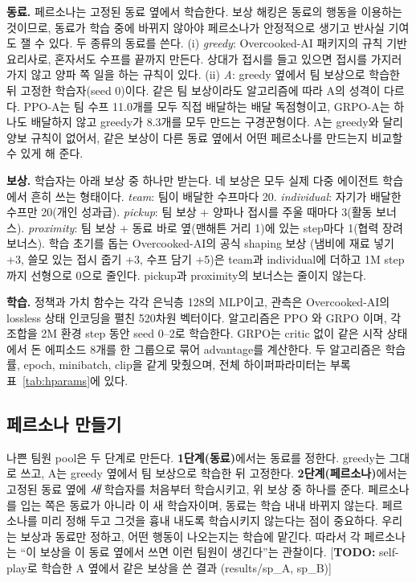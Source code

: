 \documentclass[letterpaper]{article} %
\newcommand{\TODO}[1]{[\textbf{TODO:} #1]}
\begin{document}
\textbf{동료.} 페르소나는 고정된 동료 옆에서 학습한다. 보상 해킹은 동료의 행동을 이용하는 것이므로, 동료가
학습 중에 바뀌지 않아야 페르소나가 안정적으로 생기고 반사실 기여도 잴 수 있다. 두 종류의 동료를 쓴다.
(i) \emph{greedy}: Overcooked-AI 패키지의 규칙 기반 요리사로, 혼자서도 수프를 끝까지 만든다. 상대가 접시를
들고 있으면 접시를 가지러 가지 않고 양파 쪽 일을 하는 규칙이 있다. (ii) \emph{A}: greedy 옆에서 팀 보상으로
학습한 뒤 고정한 학습자(seed 0)이다. 같은 팀 보상이라도 알고리즘에 따라 A의 성격이 다르다. PPO-A는 팀 수프
11.0개를 모두 직접 배달하는 배달 독점형이고, GRPO-A는 하나도 배달하지 않고 greedy가 8.3개를 모두 만드는
구경꾼형이다. A는 greedy와 달리 양보 규칙이 없어서, 같은 보상이 다른 동료 옆에서 어떤 페르소나를 만드는지
비교할 수 있게 해 준다.

\textbf{보상.} 학습자는 아래 보상 중 하나만 받는다. 네 보상은 모두 실제 다중 에이전트 학습에서 흔히 쓰는
형태이다. \emph{team}: 팀이 배달한 수프마다 20. \emph{individual}: 자기가 배달한 수프만 20(개인 성과급).
\emph{pickup}: 팀 보상 + 양파나 접시를 주울 때마다 3(활동 보너스). \emph{proximity}: 팀 보상 + 동료 바로
옆(맨해튼 거리 1)에 있는 step마다 1(협력 장려 보너스). 학습 초기를 돕는 Overcooked-AI의 공식 shaping 보상
(냄비에 재료 넣기 +3, 쓸모 있는 접시 줍기 +3, 수프 담기 +5)은 team과 individual에 더하고 1M step까지
선형으로 0으로 줄인다. pickup과 proximity의 보너스는 줄이지 않는다.

\textbf{학습.} 정책과 가치 함수는 각각 은닉층 128의 MLP이고, 관측은 Overcooked-AI의 lossless 상태 인코딩을
펼친 520차원 벡터이다. 알고리즘은 PPO \cite{schulman2017ppo}와 GRPO \cite{shao2024deepseekmath}이며, 각
조합을 2M 환경 step 동안 seed 0--2로 학습한다. GRPO는 critic 없이 같은 시작 상태에서 돈 에피소드 8개를
한 그룹으로 묶어 advantage를 계산한다. 두 알고리즘은 학습률, epoch, minibatch, clip을 같게 맞췄으며, 전체
하이퍼파라미터는 부록 표~\ref{tab:hparams}에 있다.

\subsection{페르소나 만들기}
나쁜 팀원 pool은 두 단계로 만든다. \textbf{1단계(동료)}에서는 동료를 정한다. greedy는 그대로 쓰고, A는
greedy 옆에서 팀 보상으로 학습한 뒤 고정한다. \textbf{2단계(페르소나)}에서는 고정된 동료 옆에 \emph{새}
학습자를 처음부터 학습시키고, 위 보상 중 하나를 준다. 페르소나를 입는 쪽은 동료가 아니라 이 새 학습자이며,
동료는 학습 내내 바뀌지 않는다. 페르소나를 미리 정해 두고 그것을 흉내 내도록 학습시키지 않는다는 점이
중요하다. 우리는 보상과 동료만 정하고, 어떤 행동이 나오는지는 학습에 맡긴다. 따라서 각 페르소나는
``이 보상을 이 동료 옆에서 쓰면 이런 팀원이 생긴다''는 관찰이다.
\TODO{self-play로 학습한 A 옆에서 같은 보상을 쓴 결과 (results/sp\_A, sp\_B)}
\end{document}
